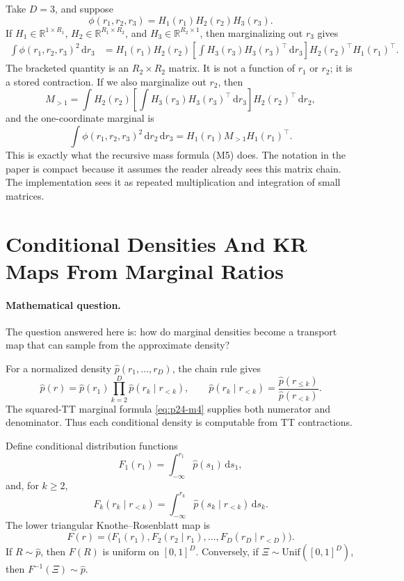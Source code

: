\documentclass[11pt]{article}
\newcommand{\R}{\mathbb R}
\newcommand{\dd}{\,\mathrm d}
\begin{document}
Take \(D=3\), and suppose
\[
    \phi(r_1,r_2,r_3)=H_1(r_1)H_2(r_2)H_3(r_3).
\]
If \(H_1\in\R^{1\times R_1}\),
\(H_2\in\R^{R_1\times R_2}\), and
\(H_3\in\R^{R_2\times 1}\), then marginalizing out \(r_3\) gives
\[
\begin{aligned}
 \int \phi(r_1,r_2,r_3)^2\dd r_3
 &=
 H_1(r_1)H_2(r_2)
 \left[\int H_3(r_3)H_3(r_3)^\top\dd r_3\right]
 H_2(r_2)^\top H_1(r_1)^\top.
\end{aligned}
\label{eq:p24-m7}
\]
The bracketed quantity is an \(R_2\times R_2\) matrix.  It is not a function of
\(r_1\) or \(r_2\); it is a stored contraction.  If we also marginalize out
\(r_2\), then
\[
    M_{>1}
    =
    \int
    H_2(r_2)
    \left[\int H_3(r_3)H_3(r_3)^\top\dd r_3\right]
    H_2(r_2)^\top
    \dd r_2,
    \label{eq:p24-m8}
\]
and the one-coordinate marginal is
\[
    \int\phi(r_1,r_2,r_3)^2\dd r_2\dd r_3
    =
    H_1(r_1)M_{>1}H_1(r_1)^\top.
    \label{eq:p24-m9}
\]
This is exactly what the recursive mass formula (M5) does.  The notation in the
paper is compact because it assumes the reader already sees this matrix chain.
The implementation sees it as repeated multiplication and integration of small
matrices.

\section{Conditional Densities And KR Maps From Marginal Ratios}

\paragraph{Mathematical question.}
The question answered here is: how do marginal densities become a transport map
that can sample from the approximate density?

For a normalized density \(\widehat p(r_1,\ldots,r_D)\), the chain rule gives
\[
    \widehat p(r)
    =
    \widehat p(r_1)
    \prod_{k=2}^D
    \widehat p(r_k\mid r_{<k}),
    \qquad
    \widehat p(r_k\mid r_{<k})
    =
    \frac{\widehat p(r_{\le k})}{\widehat p(r_{<k})}.
    \label{eq:p24-k1}
\]
The squared-TT marginal formula \eqref{eq:p24-m4} supplies both numerator and denominator.
Thus each conditional density is computable from TT contractions.

Define conditional distribution functions
\[
    F_1(r_1)=\int_{-\infty}^{r_1}\widehat p(s_1)\dd s_1,
    \label{eq:p24-k2}
\]
and, for \(k\ge2\),
\[
    F_k(r_k\mid r_{<k})
    =
    \int_{-\infty}^{r_k}
    \widehat p(s_k\mid r_{<k})\dd s_k.
    \label{eq:p24-k3}
\]
The lower triangular Knothe--Rosenblatt map is
\[
    F(r)
    =
    \bigl(
    F_1(r_1),
    F_2(r_2\mid r_1),
    \ldots,
    F_D(r_D\mid r_{<D})
    \bigr).
    \label{eq:p24-k4}
\]
If \(R\sim\widehat p\), then \(F(R)\) is uniform on \([0,1]^D\).  Conversely, if
\(\Xi\sim \mathrm{Unif}([0,1]^D)\), then \(F^{-1}(\Xi)\sim\widehat p\).
\end{document}
